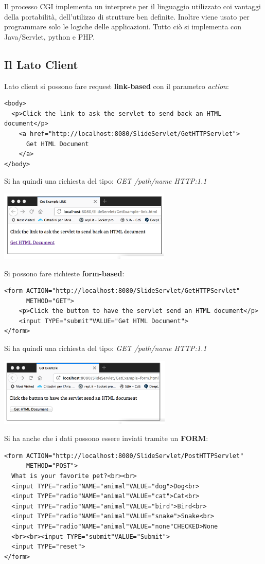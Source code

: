 \message{ !name(sd.tex)}\documentclass[a4paper,12pt, oneside]{book}
\begin{document}
Il processo CGI implementa un interprete per il linguaggio utilizzato coi vantaggi della portabilità, dell'utilizzo di strutture ben definite. Inoltre viene usato per programmare solo le logiche delle applicazioni. Tutto ciò si implementa con Java/Servlet, python e PHP. \\
\subsection{Il Lato Client}
Lato client si possono fare request \textbf{link-based} con il parametro \textit{action}:
\begin{verbatim}
<body>
  <p>Click the link to ask the servlet to send back an HTML document</p>
    <a href="http://localhost:8080/SlideServlet/GetHTTPServlet"> 
      Get HTML Document      
    </a>
</body>
\end{verbatim}
Si ha quindi una richiesta del tipo: \textit{GET /path/name HTTP:1.1}\\
\begin{center}
	\includegraphics[scale=0.7]{img/lb.png}
\end{center}
Si possono fare richieste \textbf{form-based}:
\begin{verbatim}
<form ACTION="http://localhost:8080/SlideServlet/GetHTTPServlet"
      METHOD="GET">
    <p>Click the button to have the servlet send an HTML document</p>
    <input TYPE="submit"VALUE="Get HTML Document">
</form>
\end{verbatim}
Si ha quindi una richiesta del tipo: \textit{GET /path/name HTTP:1.1}\\
\begin{center}
	\includegraphics[scale=0.7]{img/fb.png}
\end{center}
Si ha anche che i dati possono essere inviati tramite un \textbf{FORM}:
\begin{verbatim}
<form ACTION="http://localhost:8080/SlideServlet/PostHTTPServlet"
      METHOD="POST">  
  What is your favorite pet?<br><br>
  <input TYPE="radio"NAME="animal"VALUE="dog">Dog<br>
  <input TYPE="radio"NAME="animal"VALUE="cat">Cat<br>
  <input TYPE="radio"NAME="animal"VALUE="bird">Bird<br>
  <input TYPE="radio"NAME="animal"VALUE="snake">Snake<br>
  <input TYPE="radio"NAME="animal"VALUE="none"CHECKED>None
  <br><br><input TYPE="submit"VALUE="Submit">
  <input TYPE="reset">
</form>
\end{verbatim}
\end{document}
